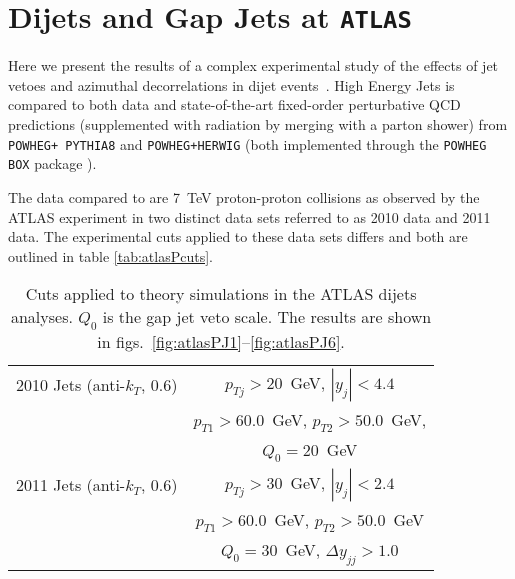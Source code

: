 \chapter{Dijets and Gap Jets at \texttt{ATLAS}}
\label{chap:ATLAS}

	Here we present the results of a complex experimental study of the effects of jet vetoes and
	azimuthal decorrelations in dijet events~\cite{Aad:2014pua}.  High Energy Jets is compared
	to both data and state-of-the-art fixed-order perturbative QCD predictions (supplemented with
	radiation by merging with a parton shower) from \texttt{POWHEG+
	PYTHIA8} and \texttt{POWHEG+HERWIG} (both implemented through the \texttt{POWHEG BOX} package
	\cite{1126-6708-2004-11-040}).

	The data compared to are 7~TeV proton-proton collisions as observed by the ATLAS
	experiment in two distinct data sets referred to as 2010 data and 2011 data.  The
	experimental cuts applied to these data sets differs and both are outlined in table
	\eqref{tab:atlasPcuts}.

	\begin{table}[bth]
	  \centering
	  \begin{tabular}{|l|c|}
	    \hline
	    2010 Jets (anti-$k_T$, 0.6) & $p_{Tj}>20$~GeV, \; $|y_j|<4.4$ \\
	    & $p_{T1}> 60.0$~GeV, \; $p_{T2}> 50.0$~GeV, \; \\
	    & $Q_0=20$~GeV \\
	    \hline
	    2011 Jets (anti-$k_T$, 0.6) & $p_{Tj}>30$~GeV, \; $|y_j|<2.4$ \\
	    & $p_{T1}> 60.0$~GeV, \; $p_{T2}> 50.0$~GeV \\
	    & \; $Q_0=30$~GeV, \; $\Delta y_{jj}>1.0$\\
	\hline
	  \end{tabular}
	  \caption{Cuts applied to theory simulations in the ATLAS dijets analyses.
	  $Q_0$ is the gap jet veto scale. The results are shown in
	  figs.~\eqref{fig:atlasPJ1}--\eqref{fig:atlasPJ6}.}
	  \label{tab:atlasPcuts}
	\end{table}


